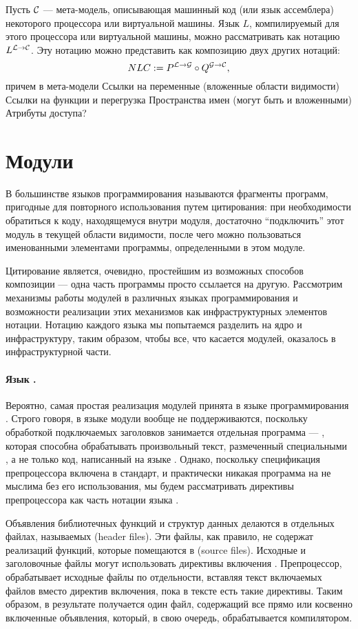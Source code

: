 Пусть $\mathcal{C}$ --- мета-модель, описывающая машинный код (или язык ассемблера) некоторого процессора или виртуальной машины. Язык $L$, компилируемый для этого процессора или виртуальной машины, можно рассматривать как нотацию $L^{{\mathcal{L}} \rightarrow{} {\mathcal{C}}}$. Эту нотацию можно представить как композицию двух других нотаций: 
$$N{L}{C} := P^{{\mathcal{L}} \rightarrow{} {\mathcal{G}}} \circ Q^{{\mathcal{G}} \rightarrow{} {\mathcal{C}}},$$
причем в мета-модели 
Ссылки на переменные (вложенные области видимости)
Ссылки на функции и перегрузка
Пространства имен (могут быть и вложенными)
Атрибуты доступа?

\section{Модули}

В большинстве языков программирования  называются фрагменты программ, пригодные для повторного использования путем цитирования: при необходимости обратиться к коду, находящемуся внутри модуля, достаточно ``подключить'' этот модуль в текущей области видимости, после чего можно пользоваться именованными элементами программы, определенными в этом модуле. \cite{???}

Цитирование является, очевидно, простейшим из возможных способов композиции --- одна часть программы просто ссылается на другую. Рассмотрим механизмы работы модулей в различных языках программирования и возможности реализации этих механизмов как инфраструктурных элементов нотации. Нотацию каждого языка мы попытаемся разделить на ядро и инфраструктуру, таким образом, чтобы все, что касается модулей, оказалось в инфраструктурной части.

\paragraph*{Язык . } Вероятно, самая простая реализация модулей принята в языке программирования  \cite{???}. Строго говоря, в языке  модули вообще не поддерживаются, поскольку обработкой подключаемых заголовков занимается отдельная программа ---  \cite{???}, которая способна обрабатывать произвольный текст, размеченный специальными , а не только код, написанный на языке . 
Однако, поскольку спецификация препроцессора включена в стандарт, и практически никакая программа на  не мыслима без его использования, мы будем рассматривать директивы препроцессора как часть нотации языка .

Объявления библиотечных функций и структур данных делаются в отдельных файлах, называемых  (header files). Эти файлы, как правило, не содержат реализаций функций, которые помещаются в  (source files). Исходные и заголовочные файлы могут использовать директивы включения . Препроцессор, обрабатывает исходные файлы по отдельности, вставляя текст включаемых файлов вместо директив включения, пока в тексте есть такие директивы. Таким образом, в результате получается один файл, содержащий все прямо или косвенно включенные объявления, который, в свою очередь, обрабатывается компилятором.

